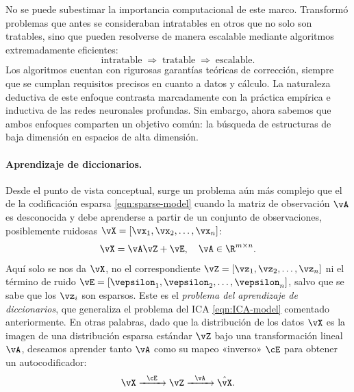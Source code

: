 \documentclass[../../book-main_es.tex]{subfiles}
\begin{document}
No se puede subestimar la importancia computacional de este marco.
Transformó problemas que antes se consideraban intratables en otros que no 
solo son tratables, sino que pueden resolverse de manera escalable mediante
algoritmos extremadamente eficientes:
\begin{equation}
    \text{intratable} \;\Longrightarrow\; \text{tratable}
    \;\Longrightarrow\; \text{escalable}.
\end{equation}
Los algoritmos cuentan con rigurosas garantías teóricas de
corrección, siempre que se cumplan requisitos precisos en cuanto a datos y cálculo. La naturaleza
deductiva de este enfoque contrasta marcadamente con la
práctica empírica e inductiva de las redes neuronales profundas. Sin embargo, ahora
sabemos que ambos enfoques comparten un objetivo común: la búsqueda
de estructuras de baja dimensión en espacios de alta dimensión.

\paragraph{Aprendizaje de diccionarios.}
Desde el punto de vista conceptual, surge un problema aún más complejo que el de la codificación esparsa
\eqref{eqn:sparse-model} cuando la matriz de observación \(\vA\)
es desconocida y debe aprenderse a partir de un conjunto de observaciones, posiblemente ruidosas
\(\vX = [\vx_{1}, \vx_{2}, \ldots, \vx_{n}]\):
\begin{equation}
    \vX = \vA \vZ + \vE, \quad \vA \in \R^{m\times n}.
    \label{eqn:dictionary-learning}
\end{equation}
Aquí solo se nos da \(\vX\), no el correspondiente \(\vZ =
[\vz_{1}, \vz_{2}, \ldots, \vz_{n}]\) ni el término de ruido \(\vE =
[\vepsilon_{1}, \vepsilon_{2}, \ldots, \vepsilon_{n}]\), salvo que
se sabe que los \(\vz_{i}\) son esparsos. Este es el
\textit{problema del aprendizaje de diccionarios}, que generaliza el problema del ICA
\eqref{eqn:ICA-model} comentado anteriormente. En otras palabras,
dado que la distribución de los datos \(\vX\) es la imagen de una
distribución esparsa estándar \(\vZ\) bajo una transformación lineal
\(\vA\), deseamos aprender tanto \(\vA\) como su mapeo «inverso»
\(\cE\) para obtener un autocodificador:
\begin{equation}
    \vX   \xrightarrow{\hspace{2mm} \cE\hspace{2mm}}  \vZ
    \xrightarrow{\hspace{2mm} \vA \hspace{2mm}} \hat{\vX}.
    \label{eqn:decoding-DL}
\end{equation}
\end{document}
